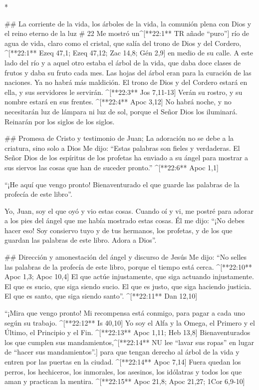 \begin{paracols}{2}
\begin{english}
\end{english}
\switchcolumn[0]*

## La corriente de la vida, los árboles de la vida, la comunión plena con Dios y el reino eterno de la luz
# 22
 Me mostró un^[**22:1** TR añade “puro”] río de agua de vida, claro como el cristal, que salía del trono de Dios y del Cordero, ^[**22:1** Ezeq 47,1; Ezeq 47,12; Zac 14,8; Gén 2,9]  en medio de su calle. A este lado del río y a aquel otro estaba el árbol de la vida, que daba doce clases de frutos y daba su fruto cada mes. Las hojas del árbol eran para la curación de las naciones.  Ya no habrá más maldición. El trono de Dios y del Cordero estará en ella, y sus servidores le servirán. ^[**22:3** Jos 7,11-13]  Verán su rostro, y su nombre estará en sus frentes. ^[**22:4** Apoc 3,12]  No habrá noche, y no necesitarán luz de lámpara ni luz de sol, porque el Señor Dios los iluminará. Reinarán por los siglos de los siglos.

## Promesa de Cristo y testimonio de Juan; La adoración no se debe a la criatura, sino solo a Dios
 Me dijo: “Estas palabras son fieles y verdaderas. El Señor Dios de los espíritus de los profetas ha enviado a su ángel para mostrar a sus siervos las cosas que han de suceder pronto.” ^[**22:6** Apoc 1,1]

 “¡He aquí que vengo pronto! Bienaventurado el que guarde las palabras de la profecía de este libro”.

 Yo, Juan, soy el que oyó y vio estas cosas. Cuando oí y vi, me postré para adorar a los pies del ángel que me había mostrado estas cosas.  Él me dijo: “¡No debes hacer eso! Soy consiervo tuyo y de tus hermanos, los profetas, y de los que guardan las palabras de este libro. Adora a Dios”.

## Dirección y amonestación del ángel y discurso de Jesús
 Me dijo: “No selles las palabras de la profecía de este libro, porque el tiempo está cerca. ^[**22:10** Apoc 1,3; Apoc 10,4]  El que actúe injustamente, que siga actuando injustamente. El que es sucio, que siga siendo sucio. El que es justo, que siga haciendo justicia. El que es santo, que siga siendo santo”. ^[**22:11** Dan 12,10]

 “¡Mira que vengo pronto! Mi recompensa está conmigo, para pagar a cada uno según su trabajo. ^[**22:12** Is 40,10]  Yo soy el Alfa y la Omega, el Primero y el Último, el Principio y el Fin. ^[**22:13** Apoc 1,11; Heb 13,8]  Bienaventurados los que cumplen sus mandamientos,^[**22:14** NU lee “lavar sus ropas” en lugar de “hacer sus mandamientos”.] para que tengan derecho al árbol de la vida y entren por las puertas en la ciudad. ^[**22:14** Apoc 7,14]  Fuera quedan los perros, los hechiceros, los inmorales, los asesinos, los idólatras y todos los que aman y practican la mentira. ^[**22:15** Apoc 21,8; Apoc 21,27; 1Cor 6,9-10]


\end{paracols}
